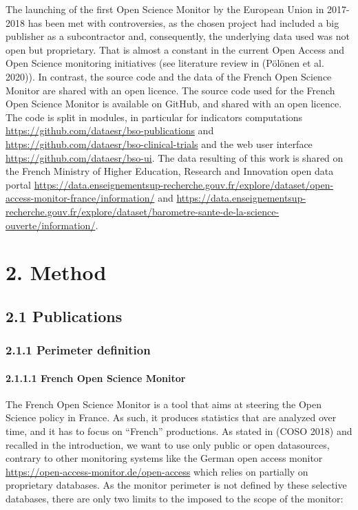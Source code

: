 \documentclass[
]{article}
\begin{document}
The launching of the first Open Science Monitor by the European Union in
2017-2018 has been met with controversies, as the chosen project had
included a big publisher as a subcontractor and, consequently, the
underlying data used was not open but proprietary. That is almost a
constant in the current Open Access and Open Science monitoring
initiatives (see literature review in (Pölönen et al. 2020)). In
contrast, the source code and the data of the French Open Science
Monitor are shared with an open licence. The source code used for the
French Open Science Monitor is available on GitHub, and shared with an
open licence. The code is split in modules, in particular for indicators
computations \url{https://github.com/dataesr/bso-publications} and
\url{https://github.com/dataesr/bso-clinical-trials} and the web user
interface \url{https://github.com/dataesr/bso-ui}. The data resulting of
this work is shared on the French Ministry of Higher Education, Research
and Innovation open data portal
\url{https://data.enseignementsup-recherche.gouv.fr/explore/dataset/open-access-monitor-france/information/}
and
\url{https://data.enseignementsup-recherche.gouv.fr/explore/dataset/barometre-sante-de-la-science-ouverte/information/}.

\hypertarget{method}{%
\section{2. Method}\label{method}}

\hypertarget{publications}{%
\subsection{2.1 Publications}\label{publications}}

\hypertarget{perimeter-definition}{%
\subsubsection{2.1.1 Perimeter definition}\label{perimeter-definition}}

\hypertarget{french-open-science-monitor}{%
\paragraph{2.1.1.1 French Open Science
Monitor}\label{french-open-science-monitor}}

The French Open Science Monitor is a tool that aims at steering the Open
Science policy in France. As such, it produces statistics that are
analyzed over time, and it has to focus on ``French'' productions. As
stated in (COSO 2018) and recalled in the introduction, we want to use
only public or open datasources, contrary to other monitoring systems
like the German open access monitor
\url{https://open-access-monitor.de/open-access} which relies on
partially on proprietary databases. As the monitor perimeter is not
defined by these selective databases, there are only two limits to the
imposed to the scope of the monitor:
\end{document}
